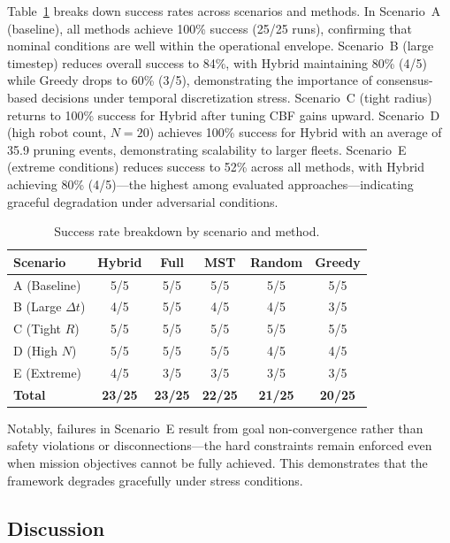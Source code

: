 Table~\ref{tab:scenarios-results} breaks down success rates across scenarios and methods. In Scenario~A (baseline), all methods achieve 100\% success (25/25 runs), confirming that nominal conditions are well within the operational envelope. Scenario~B (large timestep) reduces overall success to 84\%, with Hybrid maintaining 80\% (4/5) while Greedy drops to 60\% (3/5), demonstrating the importance of consensus-based decisions under temporal discretization stress. Scenario~C (tight radius) returns to 100\% success for Hybrid after tuning CBF gains upward. Scenario~D (high robot count, $N=20$) achieves 100\% success for Hybrid with an average of 35.9 pruning events, demonstrating scalability to larger fleets. Scenario~E (extreme conditions) reduces success to 52\% across all methods, with Hybrid achieving 80\% (4/5)---the highest among evaluated approaches---indicating graceful degradation under adversarial conditions.

\begin{table}[t]
\centering
\caption{Success rate breakdown by scenario and method.}
\label{tab:scenarios-results}
\begin{tabular}{lccccc}
\hline
\textbf{Scenario} & \textbf{Hybrid} & \textbf{Full} & \textbf{MST} & \textbf{Random} & \textbf{Greedy} \\
\hline
A (Baseline) & 5/5 & 5/5 & 5/5 & 5/5 & 5/5 \\
B (Large $\Delta t$) & 4/5 & 5/5 & 4/5 & 4/5 & 3/5 \\
C (Tight $R$) & 5/5 & 5/5 & 5/5 & 5/5 & 5/5 \\
D (High $N$) & 5/5 & 5/5 & 5/5 & 4/5 & 4/5 \\
E (Extreme) & 4/5 & 3/5 & 3/5 & 3/5 & 3/5 \\
\hline
\textbf{Total} & \textbf{23/25} & \textbf{23/25} & \textbf{22/25} & \textbf{21/25} & \textbf{20/25} \\
\hline
\end{tabular}
\end{table}

Notably, failures in Scenario~E result from goal non-convergence rather than safety violations or disconnections---the hard constraints remain enforced even when mission objectives cannot be fully achieved. This demonstrates that the framework degrades gracefully under stress conditions.

\subsection{Discussion}

